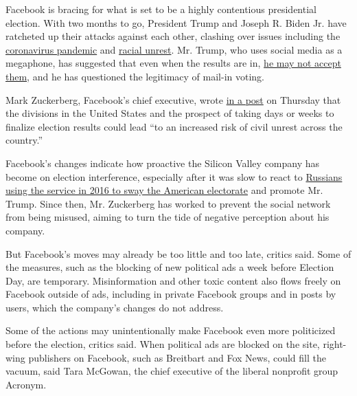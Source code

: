 Facebook is bracing for what is set to be a highly contentious
presidential election. With two months to go, President Trump and Joseph
R. Biden Jr. have ratcheted up their attacks against each other,
clashing over issues including the
\href{https://www.nytimes3xbfgragh.onion/news-event/coronavirus?name=styln-coronavirus\&region=TOP_BANNER\&block=storyline_menu_recirc\&action=click\&pgtype=Article\&impression_id=af12e9e0-ed8f-11ea-80b3-d97d3f5df025\&variant=1_Show}{coronavirus
pandemic} and
\href{https://www.nytimes3xbfgragh.onion/2020/09/02/us/politics/biden-ads-trump.html?action=click\&module=Top\%20Stories\&pgtype=Homepage}{racial
unrest}. Mr. Trump, who uses social media as a megaphone, has suggested
that even when the results are in,
\href{https://www.latimes.com/world-nation/story/2020-07-19/trump-wont-commit-to-accepting-election-result}{he
may not accept them}, and he has questioned the legitimacy of mail-in
voting.

Mark Zuckerberg, Facebook's chief executive, wrote
\href{https://www.facebookcorewwwi.onion/zuck/posts/10112270823363411}{in
a post} on Thursday that the divisions in the United States and the
prospect of taking days or weeks to finalize election results could lead
``to an increased risk of civil unrest across the country.''

Facebook's changes indicate how proactive the Silicon Valley company has
become on election interference, especially after it was slow to react
to
\href{https://www.nytimes3xbfgragh.onion/2018/02/17/technology/indictment-russian-tech-facebook.html}{Russians
using the service in 2016 to sway the American electorate} and promote
Mr. Trump. Since then, Mr. Zuckerberg has worked to prevent the social
network from being misused, aiming to turn the tide of negative
perception about his company.

But Facebook's moves may already be too little and too late, critics
said. Some of the measures, such as the blocking of new political ads a
week before Election Day, are temporary. Misinformation and other toxic
content also flows freely on Facebook outside of ads, including in
private Facebook groups and in posts by users, which the company's
changes do not address.

Some of the actions may unintentionally make Facebook even more
politicized before the election, critics said. When political ads are
blocked on the site, right-wing publishers on Facebook, such as
Breitbart and Fox News, could fill the vacuum, said Tara McGowan, the
chief executive of the liberal nonprofit group Acronym.

